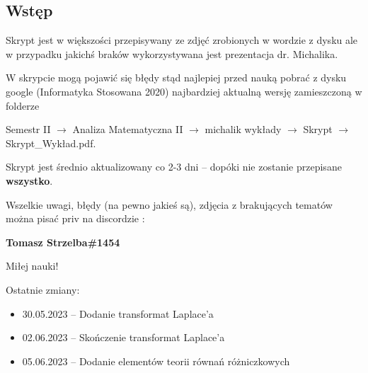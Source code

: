 \subsection{Wstęp}

Skrypt jest w większości przepisywany ze zdjęć zrobionych w wordzie z dysku ale w przypadku jakichś braków wykorzystywana jest
prezentacja dr. Michalika. 

W skrypcie mogą pojawić się błędy stąd najlepiej przed nauką pobrać z dysku google \linebreak (Informatyka Stosowana 2020) najbardziej aktualną wersję
zamieszczoną w folderze 

Semestr II $\rightarrow$ Analiza Matematyczna II $\rightarrow$ michalik wykłady $\rightarrow$ Skrypt $\rightarrow$ Skrypt\_Wykład.pdf.

Skrypt jest średnio aktualizowany co 2-3 dni -- dopóki nie zostanie przepisane \textbf{wszystko}. \medskip

Wszelkie uwagi, błędy (na pewno jakieś są), zdjęcia z brakujących tematów można pisać priv na discordzie : 

\textbf{Tomasz Strzelba\#1454}

Miłej nauki! \bigskip

Ostatnie zmiany:
\begin{itemize}
    \item 30.05.2023 -- Dodanie transformat Laplace'a
    \item 02.06.2023 -- Skończenie transformat Laplace'a
    \item 05.06.2023 -- Dodanie elementów teorii równań różniczkowych
\end{itemize}